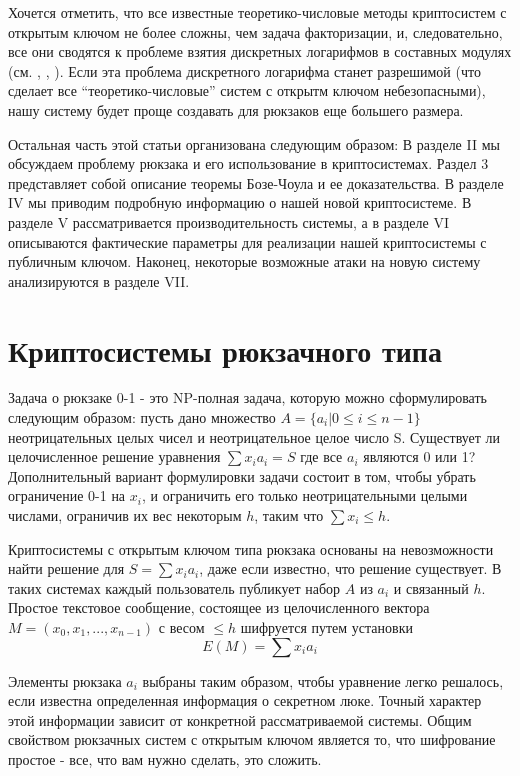 \documentclass[a4paper,12pt]{article}
\newcommand{\DL}{\newline\newline}
\begin{document}
Хочется отметить, что все известные теоретико-числовые методы криптосистем с открытым ключом не более сложны, чем задача факторизации, и, следовательно, все они сводятся к проблеме взятия дискретных логарифмов в составных модулях (см. \cite{2}, \cite{7}, \cite{19}). Если эта проблема дискретного логарифма станет разрешимой (что сделает все “теоретико-числовые” систем с открытм ключом небезопасными), нашу систему будет проще создавать для рюкзаков еще большего размера.

Остальная часть этой статьи организована следующим образом: В разделе II мы обсуждаем проблему рюкзака и его использование в криптосистемах. Раздел 3 представляет собой описание теоремы Бозе-Чоула и ее доказательства. В разделе IV мы приводим подробную информацию о нашей новой криптосистеме. В разделе V рассматривается производительность системы, а в разделе VI описываются фактические параметры для реализации нашей криптосистемы с публичным ключом. Наконец, некоторые возможные атаки на новую систему анализируются в разделе VII. \DL

\section{Криптосистемы рюкзачного типа}
Задача о рюкзаке 0-1 - это NP-полная задача, которую можно сформулировать следующим образом: пусть дано множество $ A = \{a_i |  0 \leq i \leq n-1\}$ неотрицательных целых чисел и неотрицательное целое число S. Существует ли целочисленное решение уравнения $\sum x_i a_i = S$ где все $a_i$ являются 0 или 1? Дополнительный вариант формулировки задачи состоит в том, чтобы убрать ограничение 0-1 на $x_i$, и ограничить его только неотрицательными целыми числами, ограничив их вес некоторым $h$, таким что $\sum x_i \leq h$.

Криптосистемы с открытым ключом типа рюкзака основаны на невозможности найти решение для $S= \sum x_i a_i$, даже если известно, что решение существует. В таких системах каждый пользователь публикует набор $A$ из $a_i$ и связанный $h$. Простое текстовое сообщение, состоящее из целочисленного вектора $M = (x_0, x_1, ..., x_{n-1})$ с весом $\leq h$ шифруется путем установки 
$$ E(M) = \sum x_i a_i $$

Элементы рюкзака $a_i$ выбраны таким образом, чтобы уравнение легко решалось, если известна определенная информация о секретном люке. Точный характер этой информации зависит от конкретной рассматриваемой системы. Общим свойством рюкзачных систем с открытым ключом является то, что шифрование простое - все, что вам нужно сделать, это сложить. \DL
\end{document}
